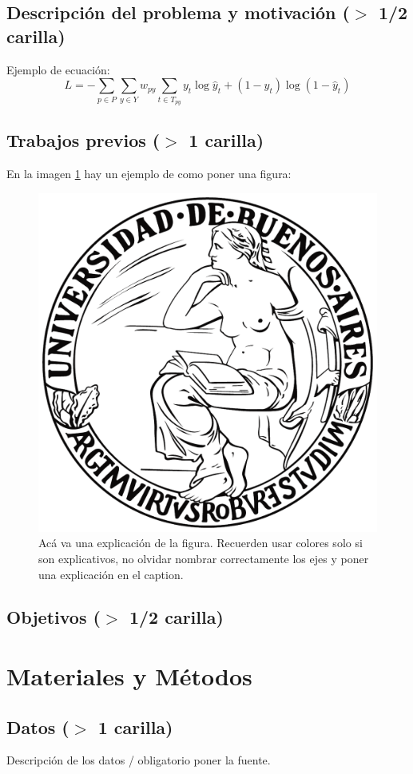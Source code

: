 \documentclass[11pt,a4paper]{tesis}
\begin{document}
\section{Descripción del problema y motivación ($>$ 1/2 carilla)}

Ejemplo de ecuación:
\begin{equation}
L = - \sum_{p \in P} \sum_{y \in Y} w_{py} \sum_{t \in T_{py}} y_t \log \hat y_t + (1-y_t) \log (1-\hat y_t)
\label{eq:loss}
\end{equation}

\section{Trabajos previos ($>$ 1 carilla)}
En la imagen \ref{fig:label} hay un ejemplo de como poner una figura:
\begin{figure}[h]
\centering
\includegraphics[width=0.5\columnwidth]{logouba.png}
\caption{Acá va una explicación de la figura. Recuerden usar colores solo si son explicativos, no olvidar nombrar correctamente los ejes y poner una explicación en el caption.}
\label{fig:label}
\end{figure}

\section{Objetivos ($>$ 1/2 carilla)}

\chapter{Materiales y Métodos}

\section{Datos ($>$ 1 carilla)} 
Descripción de los datos / obligatorio poner la fuente.
\end{document}
